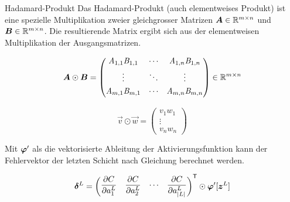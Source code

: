 \begin{appendices}
\begin{defbox}{Hadamard-Produkt}
  Das Hadamard-Produkt (auch elementweises Produkt) ist eine spezielle Multiplikation zweier gleichgrosser Matrizen
  $\bm{A} \in \mathbb{R}^{m \times n}$ und $\bm{B} \in \mathbb{R}^{m \times n}$.
  Die resultierende Matrix ergibt sich aus der elementweisen Multiplikation der Ausgangsmatrizen.

  \begin{minipage}{0.5\textwidth}
    \begin{equation*}
      \bm{A} \odot \bm{B} =
      \begin{pmatrix}
        \mathit{A}_{1,1} \mathit{B}_{1,1} & \cdots & \mathit{A}_{1,n} \mathit{B}_{1,n} \\[0.3em]
        \vdots & \ddots & \vdots \\[0.3em]
        \mathit{A}_{m,1} \mathit{B}_{m,1} & \cdots & \mathit{A}_{m,n} \mathit{B}_{m,n} \\[0.3em]
      \end{pmatrix}
      \in \mathbb{R}^{m \times n}
    \end{equation*}
  \end{minipage}
  \begin{minipage}{0.5\textwidth}
    \begin{equation*}
      \vec{v} \odot \vec{w} =
      \begin{pmatrix}
        v_1 w_1 \\
        \vdots \\
        v_n w_n
      \end{pmatrix}
    \end{equation*}

  \end{minipage}
\end{defbox}
\para{}

Mit $\bm{\varphi}'$ als die vektorisierte Ableitung der Aktivierungsfunktion
kann der Fehlervektor der letzten Schicht nach Gleichung 
berechnet werden.

\begin{equation}\label{eq:RPh0}
  \bm{\delta}^L = \begin{pmatrix} \displaystyle\frac{\partial C}{\partial a_1^L} & \displaystyle\frac{\partial C}{\partial a_2^L} & \cdots & \displaystyle\frac{\partial C}{\partial a_{|L|}^L}\end{pmatrix}^{\mathsf{T}} \odot \bm{\varphi}'[\bm{z}^L]
\end{equation}


\end{appendices}
